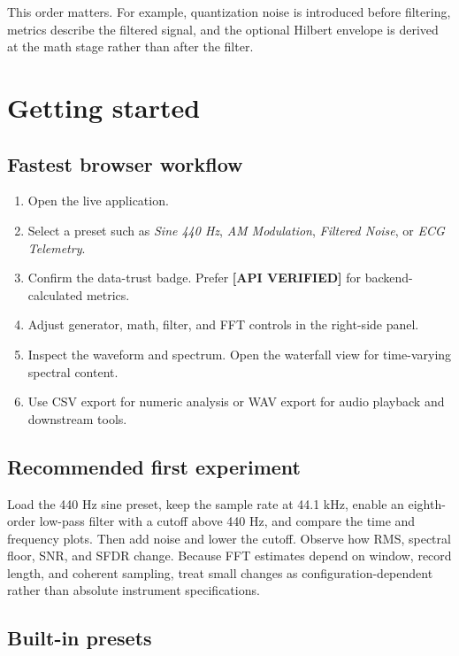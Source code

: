 \documentclass[10pt,a4paper]{article}
\newcommand{\status}[2]{\textcolor{#1}{\textbf{[#2]}}}
\begin{document}
This order matters. For example, quantization noise is introduced before filtering, metrics describe the filtered signal, and the optional Hilbert envelope is derived at the math stage rather than after the filter.

\section{Getting started}

\subsection{Fastest browser workflow}

\begin{enumerate}
  \item Open the live application.
  \item Select a preset such as \emph{Sine 440 Hz}, \emph{AM Modulation}, \emph{Filtered Noise}, or \emph{ECG Telemetry}.
  \item Confirm the data-trust badge. Prefer \status{RCGreen}{API VERIFIED} for backend-calculated metrics.
  \item Adjust generator, math, filter, and FFT controls in the right-side panel.
  \item Inspect the waveform and spectrum. Open the waterfall view for time-varying spectral content.
  \item Use CSV export for numeric analysis or WAV export for audio playback and downstream tools.
\end{enumerate}

\subsection{Recommended first experiment}

Load the 440 Hz sine preset, keep the sample rate at 44.1 kHz, enable an eighth-order low-pass filter with a cutoff above 440 Hz, and compare the time and frequency plots. Then add noise and lower the cutoff. Observe how RMS, spectral floor, SNR, and SFDR change. Because FFT estimates depend on window, record length, and coherent sampling, treat small changes as configuration-dependent rather than absolute instrument specifications.

\subsection{Built-in presets}
\end{document}
